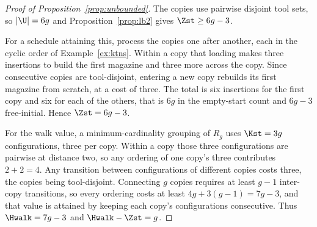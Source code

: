 \begin{proof}[Proof of Proposition~\ref{prop:unbounded}]
The copies use pairwise disjoint tool sets, so $\lvert\U\rvert=6g$ and
Proposition~\ref{prop:lb2} gives $\Zst\ge6g-3$.

For a schedule attaining this, process the copies one after another, each in the
cyclic order of Example~\ref{ex:ktns}. Within a copy that loading makes three
insertions to build the first magazine and three more across the copy. Since
consecutive copies are tool-disjoint, entering a new copy rebuilds its first magazine
from scratch, at a cost of three. The total is six insertions for the first copy and
six for each of the others, that is $6g$ in the empty-start count and $6g-3$
free-initial. Hence $\Zst=6g-3$.

For the walk value, a minimum-cardinality grouping of $R_g$ uses $\Kst=3g$
configurations, three per copy. Within a copy those three configurations are pairwise
at distance two, so any ordering of one copy's three contributes $2+2=4$. Any
transition between configurations of different copies costs three, the copies being
tool-disjoint. Connecting $g$ copies requires at least $g-1$ inter-copy transitions, so
every ordering costs at least $4g+3(g-1)=7g-3$, and that value is attained by keeping
each copy's configurations consecutive. Thus $\Hwalk=7g-3$ and $\Hwalk-\Zst=g$.
\end{proof}

